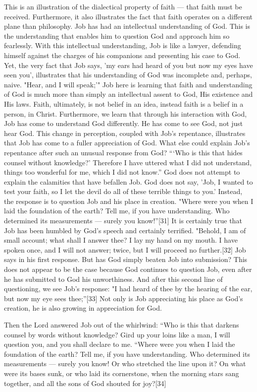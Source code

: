 This is an illustration of the dialectical property of faith — that faith must be received. Furthermore, it also illustrates the fact that faith operates on a different plane than philosophy. Job has had an intellectual understanding of God. This is the understanding that enables him to question God and approach him so fearlessly. With this intellectual understanding, Job is like a lawyer, defending himself against the charges of his companions and presenting his case to God. Yet, the very fact that Job says, 'my ears had heard of you but now my eyes have seen you', illustrates that his understanding of God was incomplete and, perhaps, naive.
"Hear, and I will speak;'" Job here is learning that faith and understanding of God is much more than simply an intellectual assent to God, His existence and His laws. Faith, ultimately, is not belief in an idea, instead faith is a belief in a person, in Christ. Furthermore, we learn that through his interaction with God, Job has come to understand God differently. He has come to see God, not just hear God. This change in perception, coupled with Job's repentance, illustrates that Job has come to a fuller appreciation of God. What else could explain Job's repentance after such an unusual response from God? 
“‘Who is this that hides counsel without knowledge?’ Therefore I have uttered what I did not understand, things too wonderful for me, which I did not know.” God does not attempt to explain the calamities that have befallen Job. God does not say, 'Job, I wanted to test your faith, so I let the devil do all of these terrible things to you.' Instead, the response is to question Job and his place in creation. "Where were you when I laid the foundation of the earth? Tell me, if you have understanding. Who determined its measurements — surely you know!”[31] It is certainly true that Job has been humbled by God's speech and certainly terrified. 
"Behold, I am of small account; what shall I answer thee? I lay my hand on my mouth. I have spoken once, and I will not answer; twice, but I will proceed no further.[32] Job says in his first response. But has God simply beaten Job into submission? This does not appear to be the case because God continues to question Job, even after he has submitted to God his unworthiness. And after this second line of questioning, we see Job's response: "I had heard of thee by the hearing of the ear, but now my eye sees thee;”[33] Not only is Job appreciating his place as God's creation, he is also growing in appreciation for God.


Then the Lord answered Job out of the whirlwind: “Who is this that darkens counsel by words without knowledge? Gird up your loins like a man, I will question you, and you shall declare to me. “Where were you when I laid the foundation of the earth? Tell me, if you have understanding. Who determined its measurements — surely you know! Or who stretched the line upon it? On what were its bases sunk, or who laid its cornerstone, when the morning stars sang together, and all the sons of God shouted for joy?[34]


